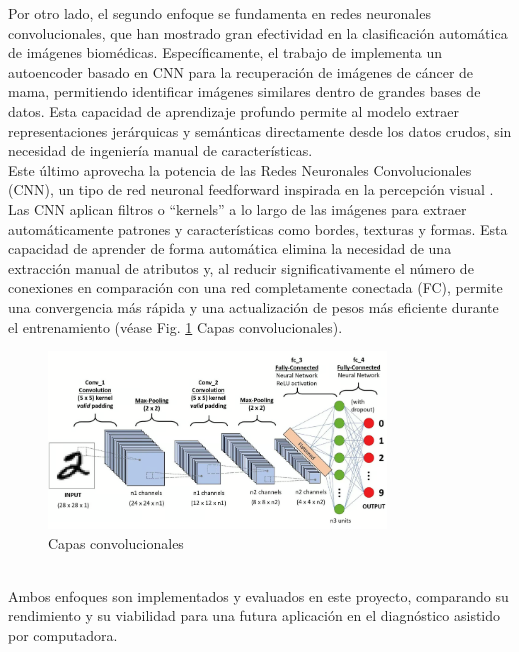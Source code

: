 \documentclass[12pt]{article} %
\begin{document}
Por otro lado, el segundo enfoque se fundamenta en redes neuronales convolucionales, que han mostrado gran efectividad en la clasificación automática de imágenes biomédicas. Específicamente, el trabajo de \cite{minarno2021cnn} implementa un autoencoder basado en CNN para la recuperación de imágenes de cáncer de mama, permitiendo identificar imágenes similares dentro de grandes bases de datos. Esta capacidad de aprendizaje profundo permite al modelo extraer representaciones jerárquicas y semánticas directamente desde los datos crudos, sin necesidad de ingeniería manual de características.\\

Este último aprovecha la potencia de las Redes Neuronales Convolucionales (CNN), un tipo de red neuronal feedforward inspirada en la percepción visual \cite{hubel1962receptive}. Las CNN aplican filtros o “kernels” a lo largo de las imágenes para extraer automáticamente patrones y características como bordes, texturas y formas. Esta capacidad de aprender de forma automática elimina la necesidad de una extracción manual de atributos y, al reducir significativamente el número de conexiones en comparación con una red completamente conectada (FC), permite una convergencia más rápida y una actualización de pesos más eficiente durante el entrenamiento (véase Fig. \ref{fig:capas_convolucionales} Capas convolucionales).\\
\begin{figure}[!ht]
    \centering
    \includegraphics[width=0.8\textwidth]{CNN.png}
    \caption{Capas convolucionales \cite{datacamp_cnn}}
    \label{fig:capas_convolucionales}
\end{figure}\\

\newpage
Ambos enfoques son implementados y evaluados en este proyecto, comparando su rendimiento y su viabilidad para una futura aplicación en el diagnóstico asistido por computadora.\\
\end{document}
